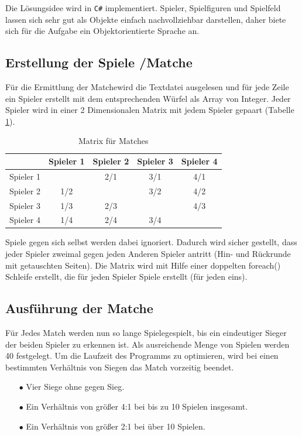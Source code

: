 \documentclass[a4paper,11pt,ngerman]{scrartcl}
\begin{document}
Die Lösungsidee wird in \texttt{C\#} implementiert. Spieler, Spielfiguren und Spielfeld lassen sich sehr gut als Objekte einfach nachvollziehbar darstellen, daher biete sich für die Aufgabe ein Objektorientierte Sprache an.
\subsection{Erstellung der Spiele /\glqq Matche\grqq} 
Für die Ermittlung der \glqq Matche\grqq wird die Textdatei ausgelesen und für jede Zeile ein Spieler erstellt mit dem entsprechenden Würfel als Array von Integer. Jeder Spieler wird in einer 2 Dimensionalen Matrix mit jedem Spieler gepaart (Tabelle \ref{table:Matrix}).
\begin{table}	
	\centering
	\begin{tabular}{|c|c|c|c|c|}	
		\hline
		& Spieler 1 & Spieler 2 & Spieler 3 & Spieler 4\\
		\hline
		Spieler 1 &\cellcolor{mygray}& 2/1 & 3/1 & 4/1 \\	
		\hline
		Spieler 2 & 1/2 & \cellcolor{mygray} & 3/2 & 4/2 \\
		\hline
		Spieler 3 & 1/3 & 2/3 &\cellcolor{mygray}& 4/3 \\
		\hline
		Spieler 4 & 1/4 & 2/4 & 3/4 & \cellcolor{mygray} \\
		\hline
	\end{tabular}
	\caption{Matrix für Matches}
	\label{table:Matrix}
\end{table}
Spiele gegen sich selbst werden dabei ignoriert. Dadurch wird sicher gestellt, dass jeder Spieler zweimal gegen jeden Anderen Spieler antritt (Hin- und Rückrunde mit getauschten Seiten). Die Matrix wird mit Hilfe einer doppelten foreach() Schleife erstellt, die für jeden Spieler Spiele erstellt (für jeden eins).
\subsection{Ausführung der \glqq Matche\grqq}
Für Jedes Match werden nun so lange \glqq Spiele\grqq gespielt, bis ein eindeutiger Sieger der beiden Spieler zu erkennen ist. Als ausreichende Menge von Spielen werden 40 festgelegt. Um die Laufzeit des Programms zu optimieren, wird bei einen bestimmten Verhältnis von Siegen das Match vorzeitig beendet.
\begin{enumerate}
	\item[$\bullet$] Vier Siege ohne gegen Sieg.	
	\item[$\bullet$] Ein Verhältnis von größer 4:1 bei bis zu 10 Spielen insgesamt.
	\item[$\bullet$] Ein Verhältnis von größer 2:1 bei über 10 Spielen. 
\end{enumerate}
\end{document}
